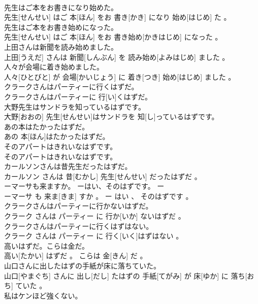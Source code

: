 \documentclass[8pt]{extreport}
\begin{document}
\begin{CJK}{UTF8}{min}
\\	先生はご本をお書きになり始めた。	
\\	先生[せんせい] はご 本[ほん] をお 書き[かき] になり 始め[はじめ] た 。
\\	先生はご本をお書き始めになった。	
\\	先生[せんせい] はご 本[ほん] をお 書き始め[かきはじめ] になった 。
\\	上田さんは新聞を読み始めました。	
\\	上田[うえだ] さんは 新聞[しんぶん] を 読み始め[よみはじめ] ました 。
\\	人々が会場に着き始めました。	
\\	人々[ひとびと] が 会場[かいじょう] に 着き[つき] 始め[はじめ] ました 。
\\	クラークさんはパーティーに行くはずだ。	
\\	クラークさんはパーティーに 行[い]くはずだ。
\\	大野先生はサンドラを知っているはずです。	
\\	大野[おおの] 先生[せんせい]はサンドラを 知[し]っているはずです。
\\	あの本はたかったはずだ。	
\\	あの 本[ほん]はたかったはずだ。
\\	そのアパートはきれいなはずです。	
\\	そのアパートはきれいなはずです。
\\	カールソンさんは昔先生だったはずだ。	
\\	カールソン さんは 昔[むかし] 先生[せんせい] だったはずだ 。
\\	ーマーサも来ますか。 ーはい、そのはずです。	ー
\\	ーマーサ も 来ま[きま] すか 。 ー はい 、 そのはずです 。
\\	クラークさんはパーティーに行かないはずだ。	
\\	クラーク さんは パーティー に 行か[いか] ないはずだ 。
\\	クラークさんはパーティーに行くはずはない。	
\\	クラーク さんは パーティー に 行く[いく]はずはない 。
\\	高いはずだ。こらは金だ。	
\\	高い[たかい] はずだ 。 こらは 金[きん] だ 。
\\	山口さんに出したはずの手紙が床に落ちていた。	
\\	山口[やまぐち] さんに 出し[だし] たはずの 手紙[てがみ] が 床[ゆか] に 落ち[おち] ていた 。
\\	私はケンほど強くない。	

\end{CJK}
\end{document}
